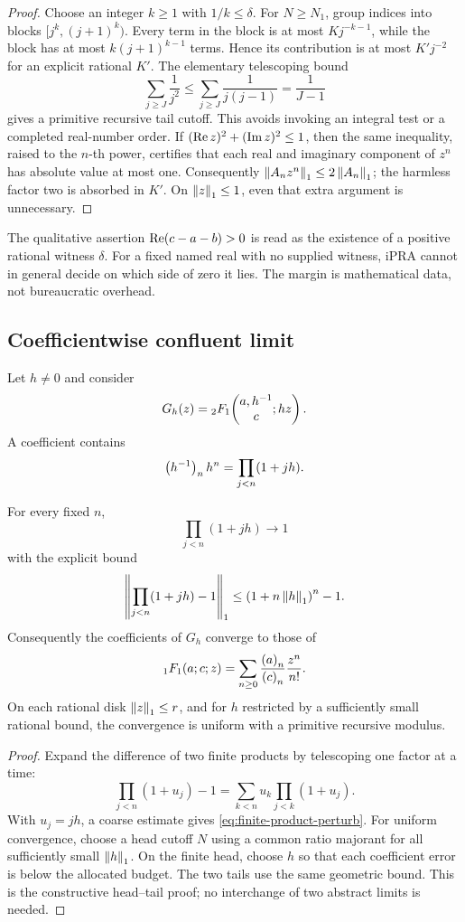 \begin{proof}
Choose an integer \(k\ge1\) with \(1/k\le\delta\).  For \(N\ge N_1\), group
indices into blocks
\([j^k,(j+1)^k)\).  Every term in the block is at most
\(Kj^{-k-1}\), while the block has at most
\(k(j+1)^{k-1}\) terms.  Hence its contribution is at most
\(K'j^{-2}\) for an explicit rational \(K'\).  The elementary telescoping
bound
\[
 \sum_{j\ge J}\frac1{j^2}
 \le\sum_{j\ge J}\frac1{j(j-1)}=\frac1{J-1}
\]
gives a primitive recursive tail cutoff.  This avoids invoking an integral
test or a completed real-number order.  If
\((\operatorname{Re} z)^2+(\operatorname{Im} z)^2\le1\), then the same inequality, raised to the
\(n\)-th power, certifies that each real and imaginary component of \(z^n\)
has absolute value at most one.  Consequently
\(\left\lVert A_nz^n\right\rVert_1\le2\left\lVert A_n\right\rVert_1\); the harmless factor two is absorbed in
\(K'\).  On \(\left\lVert z\right\rVert_1\le1\), even that extra argument is unnecessary.
\end{proof}

\begin{remark}
The qualitative assertion \(\operatorname{Re}(c-a-b)>0\) is read as the existence of a
positive rational witness \(\delta\).  For a fixed named real with no supplied
witness, iPRA cannot in general decide on which side of zero it lies.  The
margin is mathematical data, not bureaucratic overhead.
\end{remark}

\subsection{Coefficientwise confluent limit}

Let \(h\ne0\) and consider
\[
 G_h(z)={}_2F_1\!\left(\begin{matrix}a,h^{-1}\\c\end{matrix};hz\right).
\]
A coefficient contains
\[
 \left(h^{-1}\right)_{n} h^n=\prod_{j<n}(1+jh).
\]

\begin{theorem}\label{thm:confluent}
For every fixed \(n\),
\[
 \prod_{j<n}(1+jh)\longrightarrow1
\]
with the explicit bound
\begin{equation}\label{eq:finite-product-perturb}
 \left\lVert\prod_{j<n}(1+jh)-1\right\rVert_1
 \le \left(1+n\left\lVert h\right\rVert_1\right)^n-1.
\end{equation}
Consequently the coefficients of \(G_h\) converge to those of
\[
 {}_1F_1(a;c;z)=\sum_{n\ge0}\frac{\left(a\right)_{n}}{\left(c\right)_{n}}\frac{z^n}{n!}.
\]
On each rational disk \(\left\lVert z\right\rVert_1\le r\), and for \(h\) restricted by a
sufficiently small rational bound, the convergence is uniform with a primitive
recursive modulus.
\end{theorem}

\begin{proof}
Expand the difference of two finite products by telescoping one factor at a
time:
\[
 \prod_{j<n}(1+u_j)-1
 =\sum_{k<n}u_k\prod_{j<k}(1+u_j).
\]
With \(u_j=jh\), a coarse estimate gives
\eqref{eq:finite-product-perturb}.  For uniform convergence, choose a head
cutoff \(N\) using a common ratio majorant for all sufficiently small
\(\left\lVert h\right\rVert_1\).  On the finite head, choose \(h\) so that each coefficient error
is below the allocated budget.  The two tails use the same geometric bound.
This is the constructive head--tail proof; no interchange of two abstract
limits is needed.
\end{proof}
